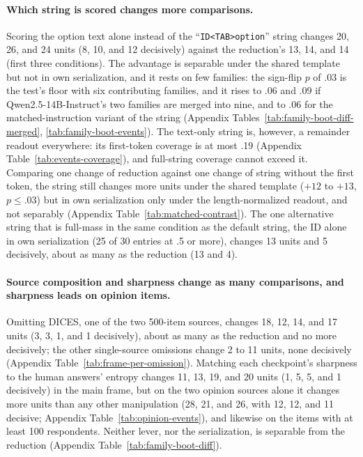 \documentclass[11pt]{article}
\begin{document}
\paragraph{Which string is scored changes more comparisons.} Scoring the option text alone instead of the ``\texttt{ID<TAB>option}'' string changes 20, 26, and 24 units (8, 10, and 12 decisively) against the reduction's 13, 14, and 14 (first three conditions). The advantage is separable under the shared template but not in own serialization, and it rests on few families: the sign-flip $p$ of .03 is the test's floor with six contributing families, and it rises to .06 and .09 if Qwen2.5-14B-Instruct's two families are merged into nine, and to .06 for the matched-instruction variant of the string (Appendix Tables~\ref{tab:family-boot-diff-merged}, \ref{tab:family-boot-events}). The text-only string is, however, a remainder readout everywhere: its first-token coverage is at most .19 (Appendix Table~\ref{tab:events-coverage}), and full-string coverage cannot exceed it. Comparing one change of reduction against one change of string without the first token, the string still changes more units under the shared template ($+12$ to $+13$, $p\le.03$) but in own serialization only under the length-normalized readout, and not separably (Appendix Table~\ref{tab:matched-contrast}). The one alternative string that is full-mass in the same condition as the default string, the ID alone in own serialization (25 of 30 entries at .5 or more), changes 13 units and 5 decisively, about as many as the reduction (13 and 4).

\paragraph{Source composition and sharpness change as many comparisons, and sharpness leads on opinion items.} Omitting DICES, one of the two 500-item sources, changes 18, 12, 14, and 17 units (3, 3, 1, and 1 decisively), about as many as the reduction and no more decisively; the other single-source omissions change 2 to 11 units, none decisively (Appendix Table~\ref{tab:frame-per-omission}). Matching each checkpoint's sharpness to the human answers' entropy changes 11, 13, 19, and 20 units (1, 5, 5, and 1 decisively) in the main frame, but on the two opinion sources alone it changes more units than any other manipulation (28, 21, and 26, with 12, 12, and 11 decisive; Appendix Table~\ref{tab:opinion-events}), and likewise on the items with at least 100 respondents. Neither lever, nor the serialization, is separable from the reduction (Appendix Table~\ref{tab:family-boot-diff}).
\end{document}

